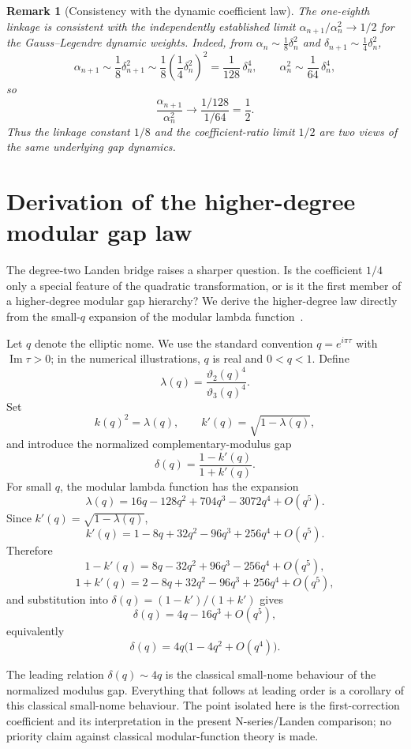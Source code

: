\documentclass[11pt]{article}
\newtheorem{remark}{Remark}
\begin{document}
\begin{remark}[Consistency with the dynamic coefficient law]
The one-eighth linkage is consistent with the independently established limit
$\alpha_{n+1}/\alpha_n^2\to 1/2$ for the Gauss--Legendre dynamic weights. Indeed,
from $\alpha_n\sim\tfrac18\delta_n^2$ and $\delta_{n+1}\sim\tfrac14\delta_n^2$,
\[
\alpha_{n+1}\sim\frac18\delta_{n+1}^2
\sim\frac18\left(\frac14\delta_n^2\right)^2
=\frac{1}{128}\,\delta_n^4,
\qquad
\alpha_n^2\sim\frac{1}{64}\,\delta_n^4,
\]
so
\[
\frac{\alpha_{n+1}}{\alpha_n^2}
\longrightarrow
\frac{1/128}{1/64}
=\frac12.
\]
Thus the linkage constant $1/8$ and the coefficient-ratio limit $1/2$ are two
views of the same underlying gap dynamics.
\end{remark}

\section{Derivation of the higher-degree modular gap law}

The degree-two Landen bridge raises a sharper question. Is the coefficient $1/4$
only a special feature of the quadratic transformation, or is it the first member
of a higher-degree modular gap hierarchy? We derive the higher-degree law
directly from the small-$q$ expansion of the modular lambda
function~\cite{whittaker1927}.

Let $q$ denote the elliptic nome. We use the standard convention
$q=e^{i\pi\tau}$ with $\operatorname{Im}\tau>0$; in the numerical
illustrations, $q$ is real and $0<q<1$. Define
\[
\lambda(q)=\frac{\vartheta_2(q)^4}{\vartheta_3(q)^4}.
\]
Set
\[
k(q)^2=\lambda(q),
\qquad
k'(q)=\sqrt{1-\lambda(q)},
\]
and introduce the normalized complementary-modulus gap
\[
\delta(q)=\frac{1-k'(q)}{1+k'(q)}.
\]
For small $q$, the modular lambda function has the expansion
\[
\lambda(q)=16q-128q^2+704q^3-3072q^4+O(q^5).
\]
Since $k'(q)=\sqrt{1-\lambda(q)}$,
\[
k'(q)=1-8q+32q^2-96q^3+256q^4+O(q^5).
\]
Therefore
\[
1-k'(q)=8q-32q^2+96q^3-256q^4+O(q^5),
\]
\[
1+k'(q)=2-8q+32q^2-96q^3+256q^4+O(q^5),
\]
and substitution into $\delta(q)=(1-k')/(1+k')$ gives
\[
\delta(q)=4q-16q^3+O(q^5),
\]
equivalently
\[
\delta(q)=4q\bigl(1-4q^2+O(q^4)\bigr).
\]

The leading relation $\delta(q)\sim 4q$ is the classical small-nome behaviour of
the normalized modulus gap. Everything that follows at leading order is a
corollary of this classical small-nome behaviour. The point isolated here is the first-correction coefficient and its
interpretation in the present N-series/Landen comparison; no priority claim
against classical modular-function theory is made.
\end{document}
